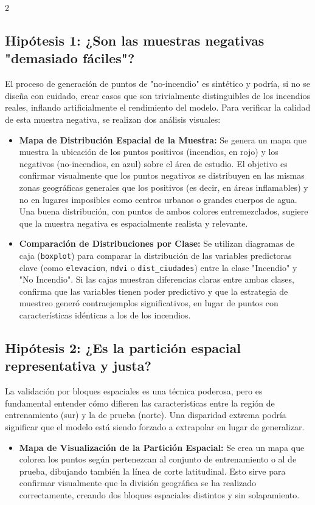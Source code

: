 \documentclass[a4paper,10pt]{article}
\begin{document}
\begin{multicols}{2}
\subsection{Hipótesis 1: ¿Son las muestras negativas "demasiado fáciles"?}
El proceso de generación de puntos de "no-incendio" es sintético y podría, si no se diseña con cuidado, crear casos que son trivialmente distinguibles de los incendios reales, inflando artificialmente el rendimiento del modelo. Para verificar la calidad de esta muestra negativa, se realizan dos análisis visuales:

\begin{itemize}
    \item \textbf{Mapa de Distribución Espacial de la Muestra:} Se genera un mapa que muestra la ubicación de los puntos positivos (incendios, en rojo) y los negativos (no-incendios, en azul) sobre el área de estudio. El objetivo es confirmar visualmente que los puntos negativos se distribuyen en las mismas zonas geográficas generales que los positivos (es decir, en áreas inflamables) y no en lugares imposibles como centros urbanos o grandes cuerpos de agua. Una buena distribución, con puntos de ambos colores entremezclados, sugiere que la muestra negativa es espacialmente realista y relevante.

    \item \textbf{Comparación de Distribuciones por Clase:} Se utilizan diagramas de caja (\texttt{boxplot}) para comparar la distribución de las variables predictoras clave (como \texttt{elevacion}, \texttt{ndvi} o \texttt{dist\_ciudades}) entre la clase "Incendio" y "No Incendio". Si las cajas muestran diferencias claras entre ambas clases, confirma que las variables tienen poder predictivo y que la estrategia de muestreo generó contraejemplos significativos, en lugar de puntos con características idénticas a los de los incendios.
\end{itemize}

\subsection{Hipótesis 2: ¿Es la partición espacial representativa y justa?}
La validación por bloques espaciales es una técnica poderosa, pero es fundamental entender cómo difieren las características entre la región de entrenamiento (sur) y la de prueba (norte). Una disparidad extrema podría significar que el modelo está siendo forzado a extrapolar en lugar de generalizar.

\begin{itemize}
    \item \textbf{Mapa de Visualización de la Partición Espacial:} Se crea un mapa que colorea los puntos según pertenezcan al conjunto de entrenamiento o al de prueba, dibujando también la línea de corte latitudinal. Esto sirve para confirmar visualmente que la división geográfica se ha realizado correctamente, creando dos bloques espaciales distintos y sin solapamiento.


\end{itemize}
\end{multicols}
\end{document}
